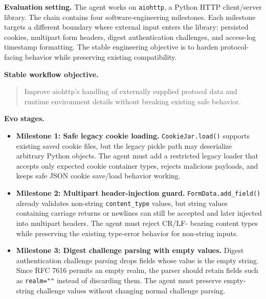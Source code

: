 \documentclass{llmxive}
\begin{document}
  \begin{tcolorbox}[
      colback=gray!4,
      colframe=black!75,
      title={Example: SWE-Chain-Evo aiohttp protocol-boundary hardening chain},
      fonttitle=\bfseries,
      breakable,
      enhanced,
      before skip=4pt,
      after skip=4pt,
      enlargepage flexible,
      pad at break*=1mm
  ]
  \small

  \textbf{Evaluation setting.}
  The agent works on \texttt{aiohttp}, a Python HTTP client/server library. The chain contains four software-engineering
milestones. Each milestone targets a different boundary where external input enters the library: persisted cookies, multipart
form headers, digest authentication challenges, and access-log timestamp formatting. The stable engineering objective is to
harden protocol-facing behavior while preserving existing compatibility.

  \vspace{0.5em}
  \textbf{Stable workflow objective.}
  \begin{quote}
  Improve aiohttp's handling of externally supplied protocol data and runtime environment details without breaking existing safe
behavior.
  \end{quote}

  \vspace{0.5em}
  \textbf{Evo stages.}

  \begin{itemize}[leftmargin=1.5em]
      \item \textbf{Milestone 1: Safe legacy cookie loading.}
      \texttt{CookieJar.load()} supports existing saved cookie files, but the legacy pickle path may deserialize arbitrary
Python objects. The agent must add a restricted legacy loader that accepts only expected cookie container types, rejects
malicious payloads, and keeps safe JSON cookie save/load behavior working.

      \item \textbf{Milestone 2: Multipart header-injection guard.}
      \texttt{FormData.add\_field()} already validates non-string \texttt{content\_type} values, but string values containing
carriage returns or newlines can still be accepted and later injected into multipart headers. The agent must reject CR/LF-
bearing content types while preserving the existing type-error behavior for non-string inputs.

      \item \textbf{Milestone 3: Digest challenge parsing with empty values.}
      Digest authentication challenge parsing drops fields whose value is the empty string. Since RFC 7616 permits an empty
realm, the parser should retain fields such as \texttt{realm=""} instead of discarding them. The agent must preserve empty-
string challenge values without changing normal challenge parsing.


\end{itemize}
\end{tcolorbox}
\end{document}
